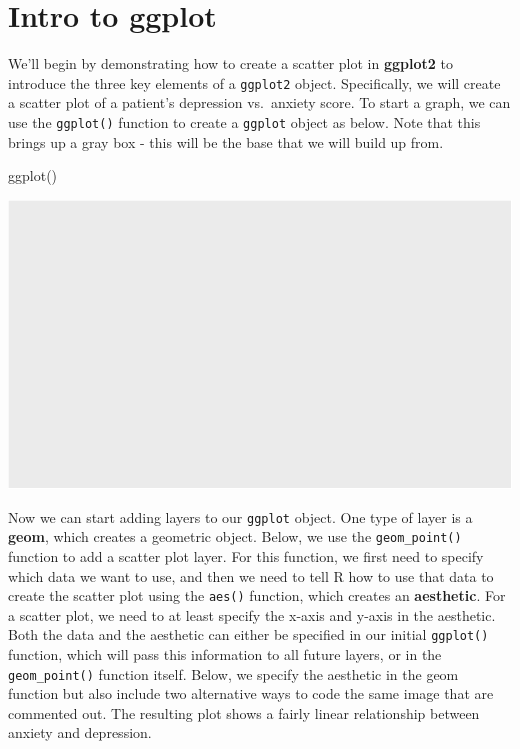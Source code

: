 \documentclass[
  letterpaper,
]{krantz}
\makeatletter
\newenvironment{Shaded}{\begin{snugshade}}{\end{snugshade}}
\newcommand{\FunctionTok}[1]{\textcolor[rgb]{0.28,0.35,0.67}{#1}}
\newcommand{\NormalTok}[1]{\textcolor[rgb]{0.00,0.23,0.31}{#1}}
\newenvironment{kframe}{%
\medskip{}
\setlength{\fboxsep}{.8em}
 \def\at@end@of@kframe{}%
 \ifinner\ifhmode%
  \def\at@end@of@kframe{\end{minipage}}%
  \begin{minipage}{\columnwidth}%
 \fi\fi%
 \def\FrameCommand##1{\hskip\@totalleftmargin \hskip-\fboxsep
 \colorbox{shadecolor}{##1}\hskip-\fboxsep
     \hskip-\linewidth \hskip-\@totalleftmargin \hskip\columnwidth}%
 \MakeFramed {\advance\hsize-\width
   \@totalleftmargin\z@ \linewidth\hsize
   \@setminipage}}%
 {\par\unskip\endMakeFramed%
 \at@end@of@kframe}
\renewenvironment{Shaded}{\begin{kframe}}{\end{kframe}}
\makeatother
\begin{document}
\section{Intro to ggplot}\label{intro-to-ggplot}

We'll begin by demonstrating how to create a scatter plot in
\textbf{ggplot2} to introduce the three key elements of a
\texttt{ggplot2} object. Specifically, we will create a scatter plot of
a patient's depression vs.~anxiety score. To start a graph, we can use
the \texttt{ggplot()} function to create a \texttt{ggplot} object as
below. Note that this brings up a gray box - this will be the base that
we will build up from.

\begin{Shaded}
\begin{Highlighting}[]
\FunctionTok{ggplot}\NormalTok{()}
\end{Highlighting}
\end{Shaded}

\begin{center}
\includegraphics[width=1\textwidth,height=\textheight]{book/visualization_ggplot_files/figure-pdf/unnamed-chunk-2-1.pdf}
\end{center}

Now we can start adding layers to our \texttt{ggplot} object. One type
of layer is a \textbf{geom}, which creates a geometric object. Below, we
use the \texttt{geom\_point()} function to add a scatter plot layer. For
this function, we first need to specify which data we want to use, and
then we need to tell R how to use that data to create the scatter plot
using the \texttt{aes()} function, which creates an \textbf{aesthetic}.
For a scatter plot, we need to at least specify the x-axis and y-axis in
the aesthetic. Both the data and the aesthetic can either be specified
in our initial \texttt{ggplot()} function, which will pass this
information to all future layers, or in the \texttt{geom\_point()}
function itself. Below, we specify the aesthetic in the geom function
but also include two alternative ways to code the same image that are
commented out. The resulting plot shows a fairly linear relationship
between anxiety and depression.
\end{document}
